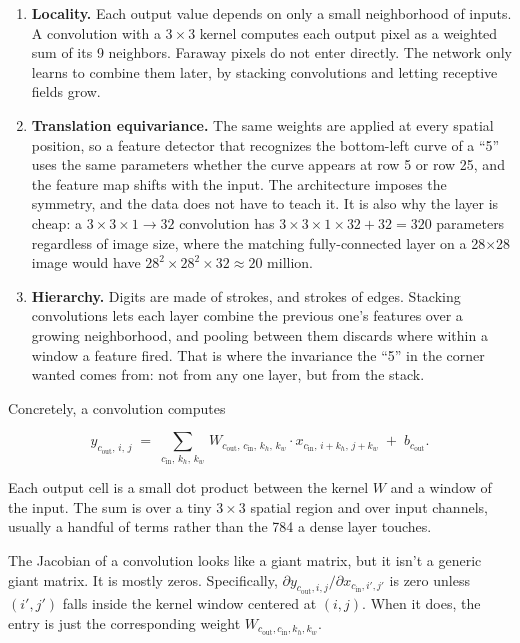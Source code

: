 \begin{enumerate}
\item \textbf{Locality.} Each output value depends on only a small
  neighborhood of inputs. A convolution with a \(3 \times 3\) kernel
  computes each output pixel as a weighted sum of its 9 neighbors.
  Faraway pixels do not enter directly. The network only learns to
  combine them later, by stacking convolutions and letting receptive
  fields grow.

\item \textbf{Translation equivariance.} The same weights are applied
  at every spatial position, so a feature detector that recognizes the
  bottom-left curve of a ``5'' uses the same parameters whether the
  curve appears at row 5 or row 25, and the feature map shifts with
  the input. The architecture imposes the symmetry, and the data does
  not have to teach it. It is also why the layer is cheap: a
  \(3 \times 3 \times 1 \to 32\) convolution has
  \(3 \times 3 \times 1 \times 32 + 32 = 320\) parameters regardless of
  image size, where the matching fully-connected layer on a
  28$\times$28 image would have
  \(28^2 \times 28^2 \times 32 \approx 20\) million.

\item \textbf{Hierarchy.} Digits are made of strokes, and strokes of
  edges. Stacking convolutions lets each layer combine the previous
  one's features over a growing neighborhood, and pooling between them
  discards where within a window a feature fired. That is where
  the invariance the ``5'' in the corner wanted comes from: not from
  any one layer, but from the stack.
\end{enumerate}

Concretely, a convolution computes

\[
y_{c_{\text{out}},\, i,\, j}
\;=\;
\sum_{c_{\text{in}},\, k_h,\, k_w}\,
W_{c_{\text{out}},\, c_{\text{in}},\, k_h,\, k_w}
\cdot
x_{c_{\text{in}},\, i + k_h,\, j + k_w}
\;+\;
b_{c_{\text{out}}}.
\]

Each output cell is a small dot product between the kernel \(W\)
and a window of the input. The sum is over a tiny \(3 \times 3\)
spatial region and over input channels, usually a handful of
terms rather than the 784 a dense layer touches.


The Jacobian of a convolution looks like a giant matrix, but it
isn't a generic giant matrix. It is mostly zeros. Specifically,
\(\partial y_{c_{\text{out}}, i, j} / \partial x_{c_{\text{in}}, i', j'}\)
is zero unless \((i', j')\) falls inside the kernel window centered
at \((i, j)\). When it does, the entry is just the corresponding
weight \(W_{c_{\text{out}}, c_{\text{in}}, k_h, k_w}\).

